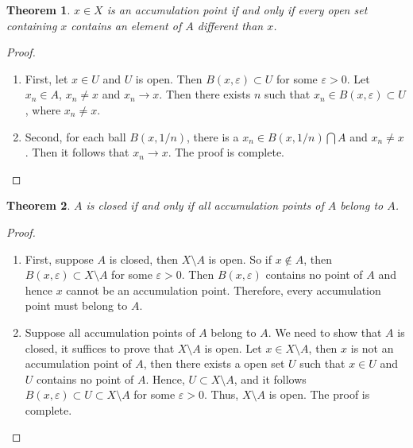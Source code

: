 \documentclass[12pt,leqno]{amsart}
\newtheorem{theorem}{Theorem}[section]
\theoremstyle{definition}
\numberwithin{equation}{subsection}
\begin{document}
\medskip

\begin{theorem}
$x\in X$ is an accumulation point if and only if every open set containing $x$ contains an element of $A$ different than $x$.
\end{theorem}
\begin{proof}
~\begin{enumerate}
    \item First, let $x \in U$ and $U$ is open. Then $B(x,\varepsilon)\subset U$ for some $\varepsilon > 0$. Let $x_n\in A$, $x_n \neq x$ and $x_n\to x$. Then there exists $n$ such that $x_n\in B(x,\varepsilon)\subset U$, where $x_n \neq x$.
    \item Second, for each ball $B(x, 1/n)$, there is a $x_n\in B(x,1/n)\bigcap A$ and $x_n \neq x$. Then it follows that $x_n\to x$. The proof is complete.
\end{enumerate}
\end{proof}

\medskip

\begin{theorem}
$A$ is closed if and only if all accumulation points of $A$ belong to $A$.
\end{theorem}
\begin{proof}
~\begin{enumerate}
    \item First, suppose $A$ is closed, then $X\setminus A$ is open. So if $x\notin A$, then $B(x,\varepsilon)\subset X\setminus A$ for some $\varepsilon>0$. Then $B(x,\varepsilon)$ contains no point of $A$ and hence $x$ cannot be an accumulation point. Therefore, every accumulation point must belong to $A$.
    \item Suppose all accumulation points of $A$ belong to $A$. We need to show that $A$ is closed, it suffices to prove that $X\setminus A$ is open. Let $x\in X\setminus A$, then $x$ is not an accumulation point of $A$, then there exists a open set $U$ such that $x\in U$ and $U$ contains no point of $A$. Hence, $U\subset X\setminus A$, and it follows $B(x,\varepsilon)\subset U\subset X\setminus A$ for some $\varepsilon > 0$. Thus, $X\setminus A$ is open. The proof is complete.
\end{enumerate}
\end{proof}

\medskip
\end{document}

